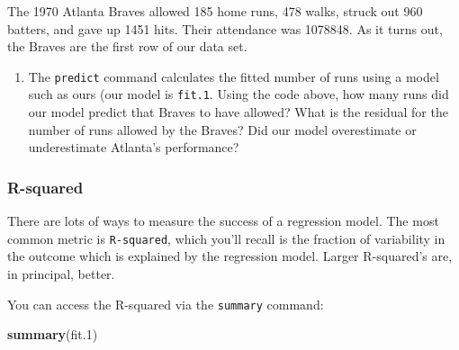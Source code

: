 \documentclass[]{article}
\newenvironment{Shaded}{\begin{snugshade}}{\end{snugshade}}
\newcommand{\DataTypeTok}[1]{\textcolor[rgb]{0.13,0.29,0.53}{#1}}
\newcommand{\DecValTok}[1]{\textcolor[rgb]{0.00,0.00,0.81}{#1}}
\newcommand{\FloatTok}[1]{\textcolor[rgb]{0.00,0.00,0.81}{#1}}
\newcommand{\KeywordTok}[1]{\textcolor[rgb]{0.13,0.29,0.53}{\textbf{#1}}}
\newcommand{\NormalTok}[1]{#1}
\newcommand{\OperatorTok}[1]{\textcolor[rgb]{0.81,0.36,0.00}{\textbf{#1}}}
\newcommand{\StringTok}[1]{\textcolor[rgb]{0.31,0.60,0.02}{#1}}
\providecommand{\tightlist}{%
  \setlength{\itemsep}{0pt}\setlength{\parskip}{0pt}}
\begin{document}
The 1970 Atlanta Braves allowed 185 home runs, 478 walks, struck out 960
batters, and gave up 1451 hits. Their attendance was 1078848. As it
turns out, the Braves are the first row of our data set.

\begin{Shaded}
\end{Shaded}

\begin{enumerate}
\def\labelenumi{\arabic{enumi}.}
\setcounter{enumi}{5}
\tightlist
\item
  The \texttt{predict} command calculates the fitted number of runs
  using a model such as ours (our model is \texttt{fit.1}. Using the
  code above, how many runs did our model predict that Braves to have
  allowed? What is the residual for the number of runs allowed by the
  Braves? Did our model overestimate or underestimate Atlanta's
  performance?
\end{enumerate}

\hypertarget{r-squared}{%
\subsubsection{R-squared}\label{r-squared}}

There are lots of ways to measure the success of a regression model. The
most common metric is \texttt{R-squared}, which you'll recall is the
fraction of variability in the outcome which is explained by the
regression model. Larger R-squared's are, in principal, better.

You can access the R-squared via the \texttt{summary} command:

\begin{Shaded}
\begin{Highlighting}[]
\KeywordTok{summary}\NormalTok{(fit}\FloatTok{.1}\NormalTok{)}
\end{Highlighting}
\end{Shaded}
\end{document}
